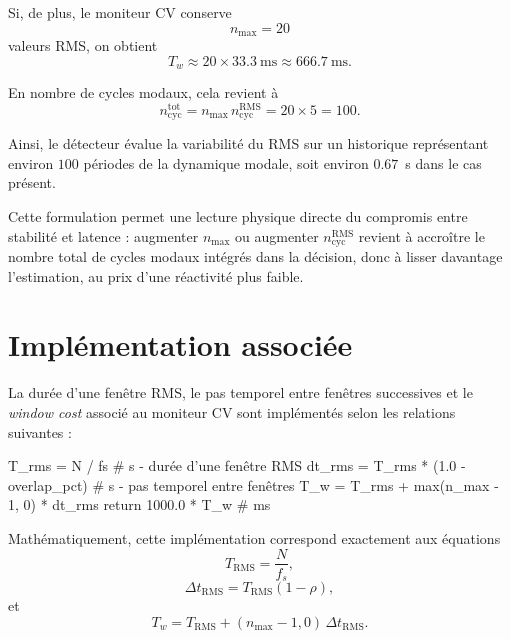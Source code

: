 \documentclass[12pt,a4paper, openany]{book}
\begin{document}
Si, de plus, le moniteur CV conserve
\begin{equation}
n_{\max} = 20
\end{equation}
valeurs RMS, on obtient
\begin{equation}
T_w \approx 20 \times 33.3~\mathrm{ms}
\approx 666.7~\mathrm{ms}.
\end{equation}

En nombre de cycles modaux, cela revient à
\begin{equation}
n_{\mathrm{cyc}}^{\mathrm{tot}}
=
n_{\max}\,n_{\mathrm{cyc}}^{\mathrm{RMS}}
=
20 \times 5
=
100.
\end{equation}

Ainsi, le détecteur évalue la variabilité du RMS sur un historique représentant environ $100$ périodes de la dynamique modale, soit environ $0.67$~s dans le cas présent.
\medskip

Cette formulation permet une lecture physique directe du compromis entre stabilité et latence : augmenter $n_{\max}$ ou augmenter $n_{\mathrm{cyc}}^{\mathrm{RMS}}$ revient à accroître le nombre total de cycles modaux intégrés dans la décision, donc à lisser davantage l'estimation, au prix d'une réactivité plus faible.

\section{Implémentation associée}

La durée d'une fenêtre RMS, le pas temporel entre fenêtres successives et le \textit{window cost} associé au moniteur CV sont implémentés selon les relations suivantes :

\begin{codeboxpro}
T_rms  = N / fs                       # s - durée d'une fenêtre RMS
dt_rms = T_rms * (1.0 - overlap_pct)  # s - pas temporel entre fenêtres
T_w    = T_rms + max(n_max - 1, 0) * dt_rms
return 1000.0 * T_w                   # ms
\end{codeboxpro}

Mathématiquement, cette implémentation correspond exactement aux équations
\begin{equation}
T_{\mathrm{RMS}} = \frac{N}{f_s},
\end{equation}
\begin{equation}
\Delta t_{\mathrm{RMS}} = T_{\mathrm{RMS}}(1-\rho),
\end{equation}
et
\begin{equation}
T_w = T_{\mathrm{RMS}} + (n_{\max}-1,0)\,\Delta t_{\mathrm{RMS}}.
\end{equation}
\end{document}
